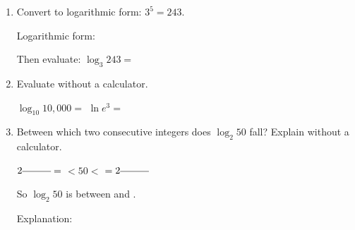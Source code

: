 \documentclass[10pt]{article}
\begin{document}
\namedateperiod

\vspace{0.16in}

\begin{enumerate}[itemsep=20pt]

\item Convert to logarithmic form: $3^5 = 243$.

      Logarithmic form: \blank{5cm}

      \vspace{0.04in}
      Then evaluate: $\log_3 243 = $ \blank{2cm}

\item Evaluate without a calculator.

      $\log_{10} 10{,}000 = $ \blank{2.5cm} \qquad\qquad $\ln e^3 = $ \blank{2.5cm}

\item Between which two consecutive integers does $\log_2 50$ fall?
      Explain without a calculator.

      \vspace{0.04in}
      $2^{\blank{1cm}} = $ \blank{1.5cm} $< 50 <$ \blank{1.5cm} $= 2^{\blank{1cm}}$

      \vspace{0.04in}
      So $\log_2 50$ is between \blank{1cm} and \blank{1cm}.

      \vspace{0.04in}
      Explanation: \writeline

\end{enumerate}
\end{document}
